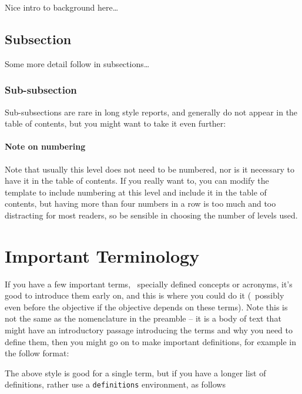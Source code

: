 Nice intro to background here\ldots{}

\subsection{Subsection}

Some more detail follow in subsections\ldots{}

\subsubsection{Sub-subsection}

Sub-subsections are rare in long style reports, and generally do not appear in the table of contents, but you might want to take it even further:

\paragraph{Note on numbering}

Note that usually this level does not need to be numbered, nor is it necessary to have it in the table of contents.  If you really want to, you can modify the template to include numbering at this level and include it in the table of contents, but having more than four numbers in a row is too much and too distracting for most readers, so be sensible in choosing the number of levels used.

\section{Important Terminology}

If you have a few important terms, \eg~specially defined concepts or acronyms, it's good to introduce them early on, and this is where you could do it (\ie~possibly even before the objective if the objective depends on these terms). Note this is not the same as the nomenclature in the preamble -- it is a body of text that might have an introductory passage introducing the terms and why you need to define them, then you might go on to make important definitions, for example in the follow format:


The above style is good for a single term, but if you have a longer list of definitions, rather use a \verb|definitions| environment, as follows

